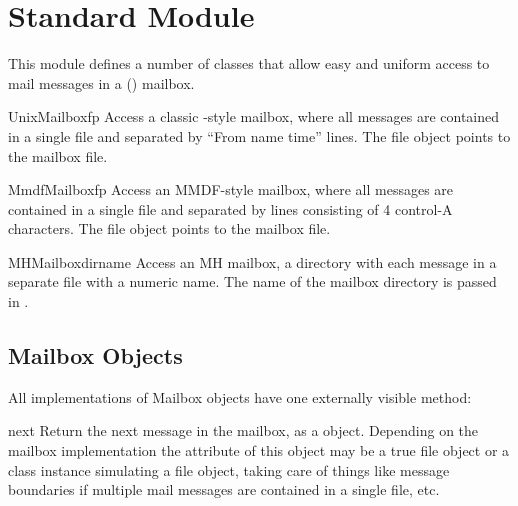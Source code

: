 \section{Standard Module }
\label{module-mailbox}


This module defines a number of classes that allow easy and uniform
access to mail messages in a (\UNIX{}) mailbox.

\begin{classdesc}{UnixMailbox}{fp}
Access a classic \UNIX{}-style mailbox, where all messages are contained
in a single file and separated by ``From name time'' lines.
The file object  points to the mailbox file.
\end{classdesc}

\begin{classdesc}{MmdfMailbox}{fp}
Access an MMDF-style mailbox, where all messages are contained
in a single file and separated by lines consisting of 4 control-A
characters.  The file object  points to the mailbox file.
\end{classdesc}

\begin{classdesc}{MHMailbox}{dirname}
Access an MH mailbox, a directory with each message in a separate
file with a numeric name.
The name of the mailbox directory is passed in .
\end{classdesc}

\subsection{Mailbox Objects}
\label{mailbox-objects}

All implementations of Mailbox objects have one externally visible
method:

\begin{funcdesc}{next}{}
Return the next message in the mailbox, as a  object.
Depending on the mailbox implementation the  attribute of this
object may be a true file object or a class instance simulating a file object,
taking care of things like message boundaries if multiple mail messages are
contained in a single file, etc.
\end{funcdesc}
